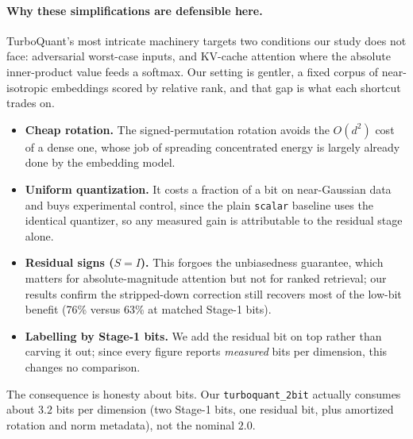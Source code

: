 \documentclass[11pt]{article}
\begin{document}
\paragraph{Why these simplifications are defensible here.} TurboQuant's most intricate machinery targets two conditions our study does not face: adversarial worst-case inputs, and KV-cache attention where the absolute inner-product value feeds a softmax. Our setting is gentler, a fixed corpus of near-isotropic embeddings scored by relative rank, and that gap is what each shortcut trades on.
\begin{itemize}
  \item \textbf{Cheap rotation.} The signed-permutation rotation avoids the $O(d^2)$ cost of a dense one, whose job of spreading concentrated energy is largely already done by the embedding model.
  \item \textbf{Uniform quantization.} It costs a fraction of a bit on near-Gaussian data and buys experimental control, since the plain \texttt{scalar} baseline uses the identical quantizer, so any measured gain is attributable to the residual stage alone.
  \item \textbf{Residual signs ($S = I$).} This forgoes the unbiasedness guarantee, which matters for absolute-magnitude attention but not for ranked retrieval; our results confirm the stripped-down correction still recovers most of the low-bit benefit (76\% versus 63\% at matched Stage-1 bits).
  \item \textbf{Labelling by Stage-1 bits.} We add the residual bit on top rather than carving it out; since every figure reports \emph{measured} bits per dimension, this changes no comparison.
\end{itemize}
The consequence is honesty about bits. Our \texttt{turboquant\_2bit} actually consumes about $3.2$ bits per dimension (two Stage-1 bits, one residual bit, plus amortized rotation and norm metadata), not the nominal $2.0$.
\end{document}
